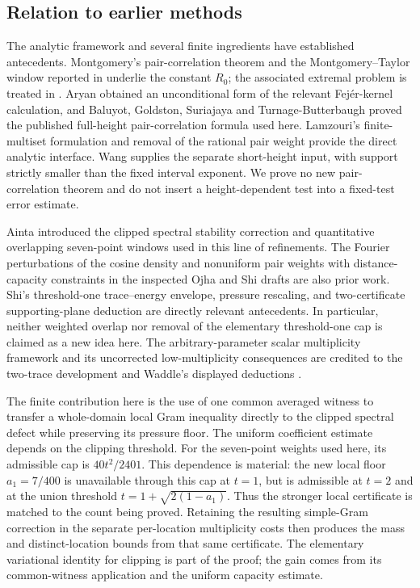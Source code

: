 \subsection{Relation to earlier methods}
\label{subsec:literaturenovelty}

The analytic framework and several finite ingredients have established
antecedents. Montgomery's pair-correlation theorem \cite{Mon73} and
the Montgomery--Taylor window reported in \cite{Mon75} underlie the
constant $R_0$; the associated extremal problem is treated in
\cite{CCLM}. Aryan \cite{Aryan} obtained an unconditional form of
the relevant Fej\'er-kernel calculation, and Baluyot, Goldston,
Suriajaya and Turnage-Butterbaugh \cite{BGST} proved the published
full-height pair-correlation formula used here. Lamzouri's
finite-multiset formulation and removal of the rational pair weight
\cite{Lamzouri} provide the direct analytic interface. Wang
\cite{Wang} supplies the separate short-height input, with support
strictly smaller than the fixed interval exponent. We prove no new
pair-correlation theorem and do not insert a height-dependent test
into a fixed-test error estimate.

Ainta \cite{Ainta} introduced the clipped spectral stability
correction and quantitative overlapping seven-point windows used in
this line of refinements. The Fourier perturbations of the cosine
density and nonuniform pair weights with distance-capacity constraints
in the inspected Ojha and Shi drafts \cite{Ojha,Shi} are also prior
work. Shi's threshold-one trace--energy envelope, pressure rescaling,
and two-certificate supporting-plane deduction are directly relevant
antecedents. In particular, neither weighted overlap nor removal of
the elementary threshold-one cap is claimed as a new idea here.
The arbitrary-parameter scalar multiplicity framework and its
uncorrected low-multiplicity consequences are credited to the
two-trace development and Waddle's displayed deductions
\cite{AF,Waddle}.

The finite contribution here is the use of one common averaged witness
to transfer a whole-domain local Gram inequality directly to the
clipped spectral defect while preserving its pressure floor. The
uniform coefficient estimate depends on the clipping threshold.
For the seven-point weights used here, its admissible cap is
$40t^2/2401$. This dependence is material: the new local floor
$a_1=7/400$ is unavailable through this cap at $t=1$, but is
admissible at $t=2$ and at the union threshold
$t=1+\sqrt{2(1-a_1)}$. Thus the stronger local certificate is matched
to the count being proved. Retaining the resulting simple-Gram
correction in the separate per-location multiplicity costs then
produces the mass and distinct-location bounds from that same
certificate. The elementary variational identity for clipping is
part of the proof; the gain comes from its common-witness application
and the uniform capacity estimate.

